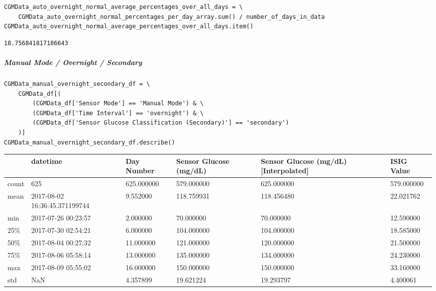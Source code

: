 \begin{verbatim}
CGMData_auto_overnight_normal_average_percentages_over_all_days = \
    CGMData_auto_overnight_normal_percentages_per_day_array.sum() / number_of_days_in_data
CGMData_auto_overnight_normal_average_percentages_over_all_days.item()
\end{verbatim}

\begin{verbatim}
18.756841817186643
\end{verbatim}

\subparagraph{Manual Mode / Overnight / Secondary}

\begin{verbatim}
CGMData_manual_overnight_secondary_df = \
    CGMData_df[(
        (CGMData_df['Sensor Mode'] == 'Manual Mode') & \
        (CGMData_df['Time Interval'] == 'overnight') & \
        (CGMData_df['Sensor Glucose Classification (Secondary)'] == 'secondary')
    )]
CGMData_manual_overnight_secondary_df.describe()
\end{verbatim}

\bigskip\noindent
\begin{tabular}{p{}p{}p{}p{}p{}p{}}
\toprule
 & datetime & Day Number & Sensor Glucose (mg/dL) & Sensor Glucose (mg/dL) [Interpolated] & ISIG Value \\
\hline
count & 625 & 625.000000 & 579.000000 & 625.000000 & 579.000000 \\
\hline
mean & 2017-08-02 16:36:45.371199744 & 9.552000 & 118.759931 & 118.456480 & 22.021762 \\
\hline
min & 2017-07-26 00:23:57 & 2.000000 & 70.000000 & 70.000000 & 12.590000 \\
\hline
25\% & 2017-07-30 02:54:21 & 6.000000 & 104.000000 & 104.000000 & 18.585000 \\
\hline
50\% & 2017-08-04 00:27:32 & 11.000000 & 121.000000 & 120.000000 & 21.500000 \\
\hline
75\% & 2017-08-06 05:58:14 & 13.000000 & 135.000000 & 134.000000 & 24.230000 \\
\hline
max & 2017-08-09 05:55:02 & 16.000000 & 150.000000 & 150.000000 & 33.160000 \\
\hline
std & NaN & 4.357899 & 19.621224 & 19.293797 & 4.400061 \\
\hline
\bottomrule
\end{tabular}

